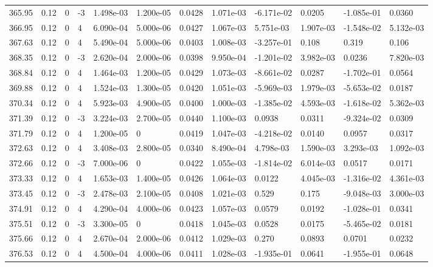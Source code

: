 \documentclass[preview]{standalone}
\begin{document}
{{{{{{{{{{{{{{{{{\begin{tabular}{L{1.2cm}C{1.2cm} C{0.3cm}C{0.5cm} C{1.4cm}C{1.4cm} C{1.4cm}C{1.4cm} C{1.6cm}C{1.6cm} C{1.6cm}C{1.6cm}}
  365.95  &  0.12  & 0     & -3 &  1.498e-03  & 1.200e-05  &  0.0428&   1.071e-03& -6.171e-02 & 0.0205   &  -1.085e-01 & 0.0360  \\ 
  366.95  &  0.12  & 0     &  4 &  6.090e-04  & 5.000e-06  &  0.0427&   1.067e-03& 5.751e-03 & 1.907e-03   &  -1.548e-02 & 5.132e-03  \\ 
  367.63  &  0.12  & 0     &  4 &  5.490e-04  & 5.000e-06  &  0.0403&   1.008e-03& -3.257e-01 & 0.108   &  0.319 & 0.106  \\ 
  368.35  &  0.12  & 0     & -3 &  2.620e-04  & 2.000e-06  &  0.0398&   9.950e-04& -1.201e-02 & 3.982e-03   &  0.0236 & 7.820e-03  \\ 
  368.84  &  0.12  & 0     &  4 &  1.464e-03  & 1.200e-05  &  0.0429&   1.073e-03& -8.661e-02 & 0.0287   &  -1.702e-01 & 0.0564  \\ 
  369.88  &  0.12  & 0     &  4 &  1.524e-03  & 1.300e-05  &  0.0420&   1.051e-03& -5.969e-03 & 1.979e-03   &  -5.653e-02 & 0.0187  \\ 
  370.34  &  0.12  & 0     &  4 &  5.923e-03  & 4.900e-05  &  0.0400&   1.000e-03& -1.385e-02 & 4.593e-03   &  -1.618e-02 & 5.362e-03  \\ 
  371.39  &  0.12  & 0     & -3 &  3.224e-03  & 2.700e-05  &  0.0440&   1.100e-03& 0.0938 & 0.0311   &  -9.324e-02 & 0.0309  \\ 
  371.79  &  0.12  & 0     &  4 &  1.200e-05  & 0  &  0.0419&   1.047e-03& -4.218e-02 & 0.0140   &  0.0957 & 0.0317  \\ 
  372.63  &  0.12  & 0     &  4 &  3.408e-03  & 2.800e-05  &  0.0340&   8.490e-04& 4.798e-03 & 1.590e-03   &  3.293e-03 & 1.092e-03  \\ 
  372.66  &  0.12  & 0     & -3 &  7.000e-06  & 0  &  0.0422&   1.055e-03& -1.814e-02 & 6.014e-03   &  0.0517 & 0.0171  \\ 
  373.33  &  0.12  & 0     &  4 &  1.653e-03  & 1.400e-05  &  0.0426&   1.064e-03& 0.0122 & 4.045e-03   &  -1.316e-02 & 4.361e-03  \\ 
  373.45  &  0.12  & 0     & -3 &  2.478e-03  & 2.100e-05  &  0.0408&   1.021e-03& 0.529 & 0.175   &  -9.048e-03 & 3.000e-03  \\ 
  374.91  &  0.12  & 0     &  4 &  4.290e-04  & 4.000e-06  &  0.0423&   1.057e-03& 0.0579 & 0.0192   &  -1.028e-01 & 0.0341  \\ 
  375.51  &  0.12  & 0     & -3 &  3.300e-05  & 0  &  0.0418&   1.045e-03& 0.0528 & 0.0175   &  -5.465e-02 & 0.0181  \\ 
  375.66  &  0.12  & 0     &  4 &  2.670e-04  & 2.000e-06  &  0.0412&   1.029e-03& 0.270 & 0.0893   &  0.0701 & 0.0232  \\ 
  376.53  &  0.12  & 0     &  4 &  4.500e-04  & 4.000e-06  &  0.0411&   1.028e-03& -1.935e-01 & 0.0641   &  -1.955e-01 & 0.0648  \\ 
\hline 
\end{tabular} 

}}}}}}}}}}}}}}}}}
\end{document}
